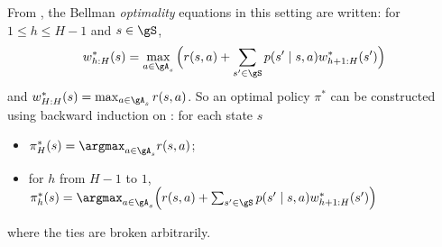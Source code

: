 From \cite[Chapter~4]{puterman2014markov}, the Bellman \emph{optimality} equations in this setting are written: for $1\le h\le H-1$ and $s\in\gS$,
\begin{equation}
    \label{eq:finite_be_opt}
    w_{h:H}^{*}(s) = \max_{a\in\gA_s}\Big(r(s,a)+\sum_{s'\in\gS}p(s'\mid s,a)w_{h+1:H}^{*}(s')\Big)
\end{equation}
and $w_{H:H}^{*}(s) =\max_{a\in\gA_s}r(s,a)$.
So an optimal policy $\pi^*$ can be constructed using backward induction on : for each state $s$
\begin{itemize}
    \item $\pi^*_H(s)=\argmax_{a\in\gA_s}r(s,a)$;
    \item for $h$ from $H-1$ to $1$, $\pi^*_h(s)=\argmax_{a\in\gA_s}\Big(r(s,a)+\sum_{s'\in\gS}p(s'\mid s,a)w_{h+1:H}^{*}(s')\Big)$
\end{itemize}
where the ties are broken arbitrarily.

